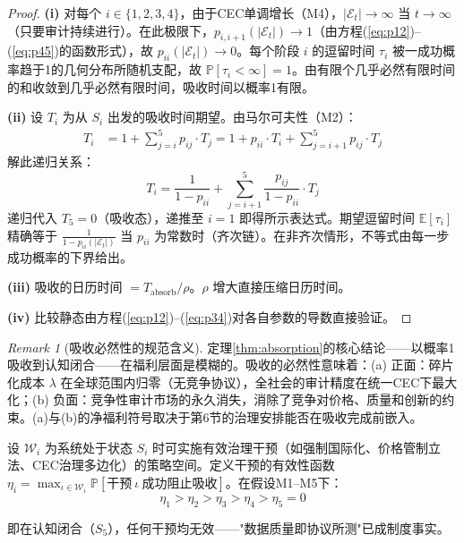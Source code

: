 \documentclass[12pt,a4paper]{ctexart}
\theoremstyle{definition}
\theoremstyle{remark}
\newtheorem{remark}{Remark}[section]
\begin{document}
\begin{proof}
\textbf{(i)} 对每个 $i \in \{1,2,3,4\}$，由于CEC单调增长（M4），$|\mathcal{E}_t| \to \infty$ 当 $t \to \infty$（只要审计持续进行）。在此极限下，$p_{i,i+1}(|\mathcal{E}_t|) \to 1$（由方程(\ref{eq:p12})--(\ref{eq:p45})的函数形式），故 $p_{ii}(|\mathcal{E}_t|) \to 0$。每个阶段 $i$ 的逗留时间 $\tau_i$ 被一成功概率趋于1的几何分布所随机支配，故 $\mathbb{P}[\tau_i < \infty] = 1$。由有限个几乎必然有限时间的和收敛到几乎必然有限时间，吸收时间以概率1有限。

\textbf{(ii)} 设 $T_i$ 为从 $S_i$ 出发的吸收时间期望。由马尔可夫性（M2）：
\begin{align}
T_i &= 1 + \sum_{j=i}^{5} p_{ij} \cdot T_j = 1 + p_{ii} \cdot T_i + \sum_{j=i+1}^{5} p_{ij} \cdot T_j
\end{align}
解此递归关系：
\begin{equation}
T_i = \frac{1}{1 - p_{ii}} + \sum_{j=i+1}^{5} \frac{p_{ij}}{1 - p_{ii}} \cdot T_j
\end{equation}
递归代入 $T_5 = 0$（吸收态），递推至 $i=1$ 即得所示表达式。期望逗留时间 $\mathbb{E}[\tau_i]$ 精确等于 $\frac{1}{1 - p_{ii}(|\mathcal{E}_t|)}$ 当 $p_{ii}$ 为常数时（齐次链）。在非齐次情形，不等式由每一步成功概率的下界给出。

\textbf{(iii)} 吸收的日历时间 $= T_{\text{absorb}} / \rho$。$\rho$ 增大直接压缩日历时间。

\textbf{(iv)} 比较静态由方程(\ref{eq:p12})--(\ref{eq:p34})对各自参数的导数直接验证。
\end{proof}

\begin{remark}[吸收必然性的规范含义]
定理\ref{thm:absorption}的核心结论——以概率1吸收到认知闭合——在福利层面是模糊的。吸收的必然性意味着：(a) 正面：碎片化成本 $\lambda$ 在全球范围内归零（无竞争协议），全社会的审计精度在统一CEC下最大化；(b) 负面：竞争性审计市场的永久消失，消除了竞争对价格、质量和创新的约束。(a)与(b)的净福利符号取决于第6节的治理安排能否在吸收完成前嵌入。
\end{remark}

\begin{proposition}[政策干预窗的单调闭合]
\label{prop:intervention-window}
设 $\mathcal{W}_i$ 为系统处于状态 $S_i$ 时可实施有效治理干预（如强制国际化、价格管制立法、CEC治理多边化）的策略空间。定义干预的有效性函数 $\eta_i = \max_{\iota \in \mathcal{W}_i} \mathbb{P}[\text{干预}\ \iota\ \text{成功阻止吸收}]$。在假设M1--M5下：
\begin{equation}
\eta_1 > \eta_2 > \eta_3 > \eta_4 > \eta_5 = 0
\label{eq:eta-ordering}
\end{equation}

即在认知闭合（$S_5$），任何干预均无效——"数据质量即协议所测"已成制度事实。
\end{proposition}
\end{document}
